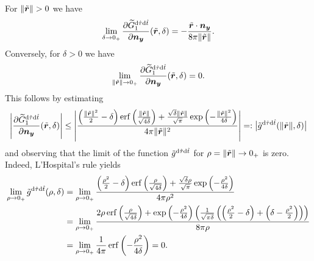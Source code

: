 \documentclass[a4paper,11pt]{article}
\begin{document}
For $\|\tilde \vr\|>0$ we have
\begin{equation*}
  \lim_{\delta \to 0_+} \frac{\partial \widetilde G^{{\mathrm{d}}\hat\tau{\mathrm{d}}\hat t}_1}{\partial {\ensuremath{{\bm{n}}}}_{{\bm{y}}}}(\tilde {{{\bm{r}}}},\delta) = -\frac{\tilde {{{\bm{r}}}} \cdot {\ensuremath{{\bm{n}}}}_{{\bm{y}}}}{8 \pi \|\tilde {{{\bm{r}}}}\|}.
\end{equation*}
Conversely, for $\delta > 0$ we have
\begin{equation*} 
  \lim_{\|\tilde {{{\bm{r}}}}\| \to 0_+} \frac{\partial \widetilde G^{{\mathrm{d}}\hat\tau{\mathrm{d}}\hat t}_1}{\partial {\ensuremath{{\bm{n}}}}_{{\bm{y}}}}(\tilde {{{\bm{r}}}},\delta) = 0.
\end{equation*}
This follows by estimating 
\begin{equation*}
	\left| \frac{\partial \widetilde{G}_1^{{\mathrm{d}} \hat\tau {\mathrm{d}}\hat t}}{\partial {\ensuremath{{\bm{n}}}}_{{\bm{y}}}}
	(\tilde{{{\bm{r}}}}, \delta) \right| 
	\leq \left| 
	\frac{\left(\frac{\| \tilde {{{\bm{r}}}} \|^2}{2} - \delta \right)
	\operatorname{erf}\left(\frac{\|\tilde {{{\bm{r}}}} \|}{\sqrt{4\delta}}  \right)
	+ \frac{\sqrt{\delta} \| \tilde {{{\bm{r}}}} \|}{\sqrt{\pi}} 
	\exp \left( -\frac{\|\tilde {{{\bm{r}}}}\|^2}{4 \delta} \right)}
	{4 \pi \|\tilde {{{\bm{r}}}}\|^2 }
	 \right| =: \big|\tilde g^{{\mathrm{d}} \hat\tau {\mathrm{d}}\hat t}(\|\tilde{{{\bm{r}}}} \|, \delta)\big|
\end{equation*}
and observing that the limit of the function $\tilde g^{{\mathrm{d}} \hat\tau {\mathrm{d}}\hat t}$ for $\rho = \|\tilde {{{\bm{r}}}}\| \rightarrow 0_+$ is zero. Indeed, L'Hospital's rule yields
\begin{align*}
	\lim_{\rho \rightarrow 0_+} \tilde g^{{\mathrm{d}} \hat\tau {\mathrm{d}}\hat t}(\rho,\delta) &=
	\lim_{\rho \rightarrow 0_+} \frac{
	\left(\frac{\rho^2}{2}-\delta \right) \operatorname{erf}\left(\frac{\rho}{\sqrt{4\delta}} \right)
	+ \frac{\sqrt{\delta} \rho}{\sqrt{\pi}} \exp \left( -\frac{\rho^2}{4 \delta} \right)}
	{4\pi \rho^2} \\ &= 
	\lim_{\rho \rightarrow 0_+} \frac{2 \rho \operatorname{erf}\left(\frac{\rho}{\sqrt{4\delta}}\right)
	+\exp\left(-\frac{\rho^2}{4\delta}\right) 
	\left( \frac{1}{\sqrt{\pi \delta}} \left(\left( \frac{\rho^2}{2} - \delta \right)
	+ \left( \delta - \frac{\rho^2}{2}\right) \right) \right)}
	{8 \pi \rho} \\
	&= \lim_{\rho \rightarrow 0_+}\frac{1}{4 \pi} \operatorname{erf}\left(-\frac{\rho^2}{4\delta}\right) = 0.
\end{align*}
\end{document}

